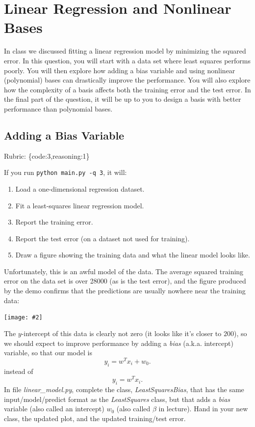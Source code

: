 \documentclass{article}
\def\rubric#1{\gre{Rubric: \{#1\}}}{}
\def\blu#1{{\color{blu}#1}}
\def\gre#1{{\color{gre}#1}}
\newcommand{\centerfig}[2]{\begin{center}\texttt{[image: \#2]}\end{center}}
\def\enum#1{\begin{enumerate}#1\end{enumerate}}
\begin{document}
\section{Linear Regression and Nonlinear Bases}

In class we discussed fitting a linear regression model by minimizing the squared error.
In this question, you will start with a data set where least squares performs poorly.
You will then explore how adding a bias variable and using nonlinear (polynomial) bases can drastically improve the performance.
You will also explore how the complexity of a basis affects both the training error and the test error.
In the final part of the question, it will be up to you to design a basis with better performance than polynomial bases.

\subsection{Adding a Bias Variable}
\rubric{code:3,reasoning:1}

If you run  \verb|python main.py -q 3|, it will:
\enum{
\item Load a one-dimensional regression dataset.
\item Fit a least-squares linear regression model.
\item Report the training error.
\item Report the test error (on a dataset not used for training).
\item Draw a figure showing the training data and what the linear model looks like.
}
Unfortunately, this is an awful model of the data. The average squared training error on the data set is over 28000
(as is the test error), and the figure produced by the demo confirms that the predictions are usually nowhere near
 the training data:
\centerfig{.5}{../figs/least_squares_no_bias.pdf}
The $y$-intercept of this data is clearly not zero (it looks like it's closer to $200$),
so we should expect to improve performance by adding a \emph{bias} (a.k.a. intercept) variable, so that our model is
\[
y_i = w^Tx_i + w_0.
\]
instead of
\[
y_i = w^Tx_i.
\]
\blu{In file \emph{linear\_model.py}, complete the class, \emph{LeastSquaresBias}, 
that has the same input/model/predict format as the \emph{LeastSquares} class, 
but that adds a \emph{bias} variable (also called an intercept) $w_0$ (also called $\beta$ in lecture). Hand in your new class, the updated plot, 
and the updated training/test error.}
\end{document}

